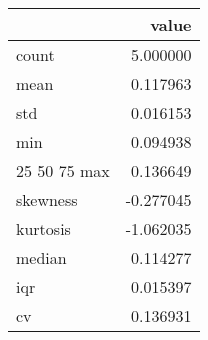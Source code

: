 \begin{tabular}{lr}
\toprule
 & value \\
\midrule
count & 5.000000 \\
mean & 0.117963 \\
std & 0.016153 \\
min & 0.094938 \\
25%
50%
75%
max & 0.136649 \\
skewness & -0.277045 \\
kurtosis & -1.062035 \\
median & 0.114277 \\
iqr & 0.015397 \\
cv & 0.136931 \\
\bottomrule
\end{tabular}
